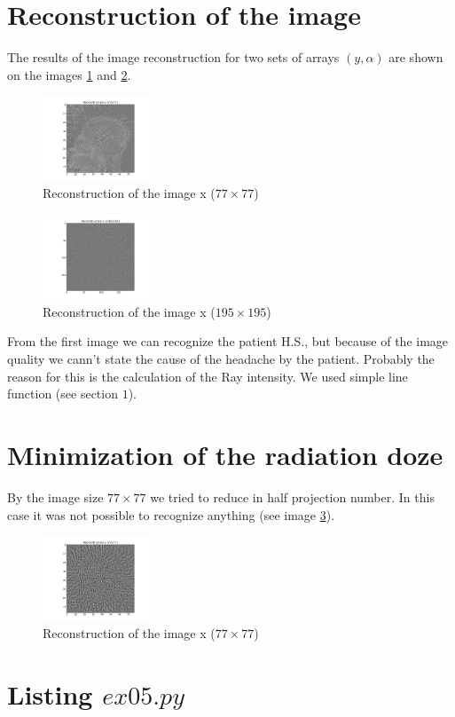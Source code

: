 \documentclass{article}
\begin{document}
\section{Reconstruction of the image}

The results of the image reconstruction for two sets of arrays $(y,\alpha)$ are shown on the images \ref{img2} and \ref{img3}.

\begin{figure}[hb]
        \centering
        \includegraphics[width=0.3\textwidth]{../x_77.png}
        \caption{Reconstruction of the image x ($77\times77$)}
        \label{img2}
\end{figure}

\FloatBarrier

\begin{figure}[ht]
        \centering
        \includegraphics[width=0.3\textwidth]{../x_195.png}
        \caption{Reconstruction of the image x ($195\times195$)}
        \label{img3}
\end{figure}
\FloatBarrier

From the first image we can recognize the patient H.S., but because of the image quality we cann't state the cause of the headache by the patient.
Probably the reason for this is the calculation of the Ray intensity. We used simple line function (see section $1$).

\section{Minimization of the radiation doze}

By the image size $77\times 77$ we tried to reduce in half projection number. In this case it was not possible to recognize anything (see image \ref{img4}).

\begin{figure}[htb]
        \centering
        \includegraphics[width=0.3\textwidth]{../x_77r.png}
        \caption{Reconstruction of the image x ($77\times77$)}
        \label{img4}
\end{figure}
\FloatBarrier

\section{Listing $ex05.py$}

\end{document}
